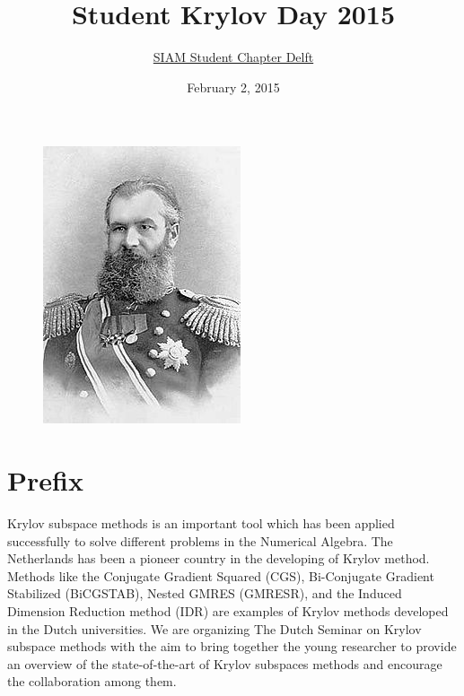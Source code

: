 \documentclass{article}
\title{\bf Student Krylov Day 2015}
\author{\href{http://sscdelft.github.io/activities/2015/02/02/krylov-day.html}{SIAM Student Chapter Delft}}
\date{February 2, 2015}
\begin{document}
\maketitle
\begin{figure}[h]
 \centering
 \includegraphics{220px-Alexey_Krylov_1910s.JPG}
\end{figure}

\section*{Prefix}
Krylov subspace methods is an important tool which has been applied successfully to solve different problems 
in the Numerical Algebra. The Netherlands has been a pioneer country in the developing of Krylov method.
Methods like the Conjugate Gradient Squared (CGS), Bi-Conjugate Gradient Stabilized (BiCGSTAB), Nested GMRES (GMRESR), and the Induced Dimension Reduction method (IDR)  
are examples of Krylov methods developed in the Dutch universities. 
We are organizing The Dutch Seminar on Krylov subspace methods with the aim 
to bring together the young researcher to provide an
overview of the state-of-the-art of Krylov subspaces methods and encourage 
the collaboration among them.
\null\vfill\eject\thispagestyle{empty}\null\vfill\eject 
\end{document}
